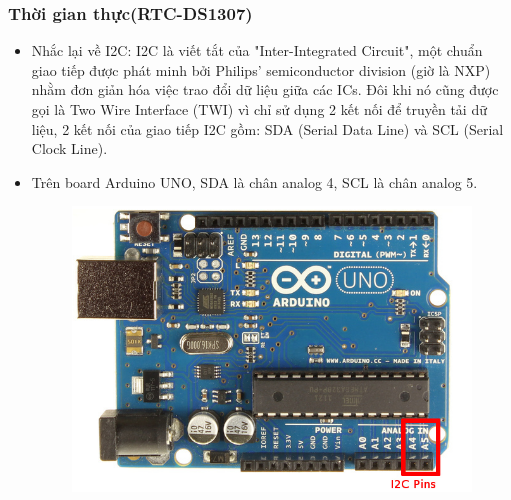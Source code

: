 \documentclass[a4paper,12pt,oneside]{article}
\begin{document}
\begin{itemize}
\subsubsection{Thời gian thực(RTC-DS1307)} 
\begin{itemize}
\item Nhắc lại về I2C: I2C là viết tắt của "Inter-Integrated Circuit", một chuẩn giao tiếp được phát minh bởi Philips’ semiconductor division (giờ là NXP) nhằm đơn giản hóa việc trao đổi dữ liệu giữa các ICs. Đôi khi nó cũng được gọi là Two Wire Interface (TWI) vì chỉ sử dụng 2 kết nối để truyền tải dữ liệu, 2 kết nối của giao tiếp I2C gồm: SDA (Serial Data Line) và SCL (Serial Clock Line).
\item Trên board Arduino UNO, SDA là chân analog 4, SCL là chân analog 5.
\begin{figure}[h!]
\begin{center}
\includegraphics[scale=0.5]{hinh/unoI2C.png}


\end{center}
\end{figure}
\end{itemize}
\end{itemize}
\end{document}
